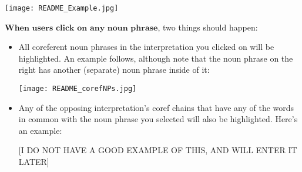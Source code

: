 \documentclass[a4paper]{article}
\begin{document}
\texttt{[image: README\_Example.jpg]}

\noindent $\textbf{When users click on any noun phrase}$, two things should happen:

\begin{itemize}
\item All coreferent noun phrases in the interpretation you clicked on will be highlighted. An example follows, although note that the noun phrase on the right has another (separate) noun phrase inside of it:

\texttt{[image: README\_corefNPs.jpg]}

\item Any of the opposing interpretation's coref chains that have any of the words in common with the noun phrase you selected will also be highlighted. Here's an example:

[I DO NOT HAVE A GOOD EXAMPLE OF THIS, AND WILL ENTER IT LATER]
\end{itemize}
\end{document}
